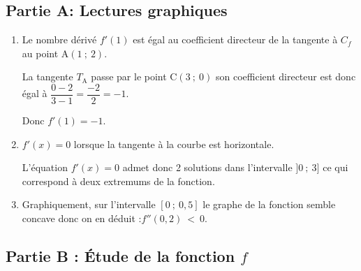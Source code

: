 \medskip

\subsection*{Partie A: Lectures graphiques}


\begin{enumerate}
\item Le nombre dérivé $f'(1)$ est égal au coefficient directeur de la tangente à $C_{f}$ au point $\mathrm{A}(1 ~;~ 2)$.

La tangente $T_{\mathrm{A}}$ passe par le point $\mathrm{C}(3 ~;~ 0)$ son coefficient directeur est donc égal à $\dfrac{0-2}{3-1}= \dfrac{-2}{2}=-1$.

Donc $f'(1)= - 1$.
\item  $f'(x)=0$ lorsque la tangente à la courbe est horizontale.

L'équation $f'(x)=0$ admet donc 2 solutions dans l'intervalle $]0 ~;~ 3]$ ce qui correspond à deux extremums de la fonction.
\item Graphiquement, sur l'intervalle $[0~;~0,5]$ le graphe de la fonction semble concave donc on en déduit :\quad $f''(0,2)~<~0$.
\end{enumerate}

\subsection*{ Partie B : Étude de la fonction \boldmath $f$\unboldmath}







